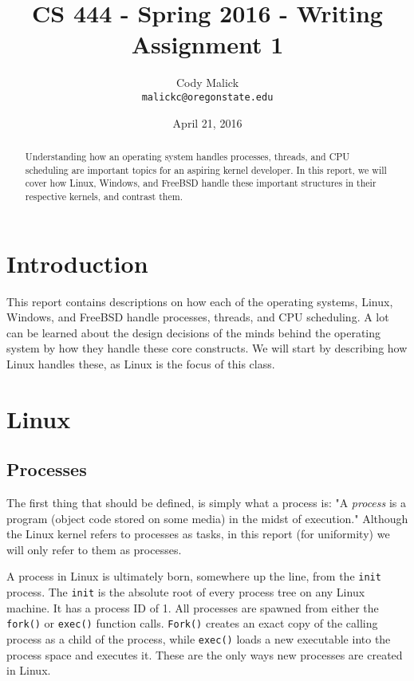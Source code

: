 \documentclass[10pt,letterpaper,onecolumn,draftclsnofoot]{IEEEtran}
\begin{document}
\begin{titlepage}
  \title{CS 444 - Spring 2016 - Writing Assignment 1}
  \author{Cody Malick\\
  \texttt{malickc@oregonstate.edu}}
  \date{April 21, 2016}
  \maketitle
  \vspace*{4cm}
  \begin{abstract}
      \noindent Understanding how an operating system handles processes, threads,
      and CPU scheduling are important topics for an aspiring kernel developer.
      In this report, we will cover how Linux, Windows, and FreeBSD handle these
      important structures in their respective kernels, and contrast them.
  \end{abstract}
\end{titlepage}

\tableofcontents
\clearpage
\section{Introduction}
This report contains descriptions on how each of the operating systems, Linux,
Windows, and FreeBSD handle processes, threads, and CPU scheduling. A lot can be
learned about the design decisions of the minds behind the operating system by
how they handle these core constructs. We will start by describing how Linux
handles these, as Linux is the focus of this class.

\section{Linux}
  \subsection{Processes}
The first thing that should be defined, is simply what a process is: "A
\textit{process} is a program (object code stored on some media) in the midst of
execution."\cite{robertlove2010} Although the Linux kernel refers to processes
as tasks, in this report (for uniformity) we will only refer to them as processes.

A process in Linux is ultimately born, somewhere up the line, from the
\texttt{init} process. The \texttt{init} is the absolute root of every process
tree on any Linux machine. It has a process ID of 1. All processes are spawned
from either the \texttt{fork()} or \texttt{exec()} function calls. \texttt{Fork()}
creates an exact copy of the calling process as a child of the process, while
\texttt{exec()} loads a new executable into the process space and executes it.
These are the only ways new processes are created in Linux.
\end{document}
